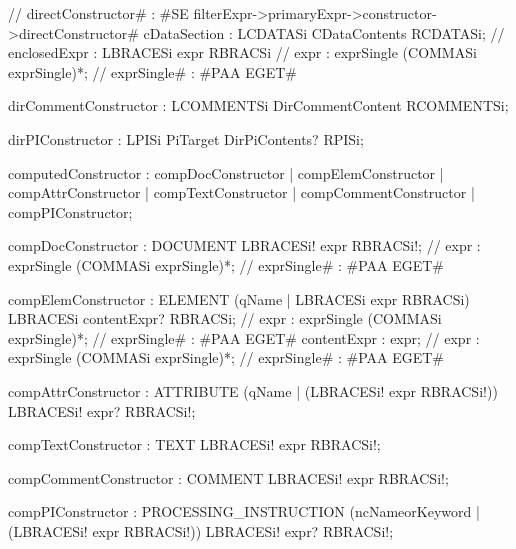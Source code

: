 //            directConstructor#            : #SE filterExpr->primaryExpr->constructor->directConstructor#
            cDataSection              : LCDATASi CDataContents RCDATASi;
//                    enclosedExpr                      : LBRACESi expr RBRACSi
//                      expr                              : exprSingle (COMMASi exprSingle)*;
//                  exprSingle#                : #PAA EGET#
        
        dirCommentConstructor          : LCOMMENTSi DirCommentContent RCOMMENTSi;
        
        dirPIConstructor            : LPISi PiTarget DirPiContents? RPISi;
        
      computedConstructor               : compDocConstructor
                                          | compElemConstructor
                                          | compAttrConstructor
                                          | compTextConstructor
                                          | compCommentConstructor
                                          | compPIConstructor; 
      
        compDocConstructor                : DOCUMENT LBRACESi! expr RBRACSi!;
//          expr                              : exprSingle (COMMASi exprSingle)*;
//            exprSingle#                : #PAA EGET#
        
        compElemConstructor               : ELEMENT (qName | LBRACESi expr RBRACSi) 
                              LBRACESi contentExpr? RBRACSi;
//          expr                              : exprSingle (COMMASi exprSingle)*;
//            exprSingle#                : #PAA EGET#
          contentExpr                       : expr;                                
//            expr                              : exprSingle (COMMASi exprSingle)*;
//              exprSingle#                : #PAA EGET#
        
        compAttrConstructor               : ATTRIBUTE (qName | (LBRACESi! expr RBRACSi!)) 
                              LBRACESi! expr? RBRACSi!;                  
        
        compTextConstructor               : TEXT LBRACESi! expr RBRACSi!;
        
        compCommentConstructor            : COMMENT LBRACESi! expr RBRACSi!;
        
        compPIConstructor                 : PROCESSING_INSTRUCTION (ncNameorKeyword | (LBRACESi! expr RBRACSi!)) 
                              LBRACESi! expr? RBRACSi!;
                              

